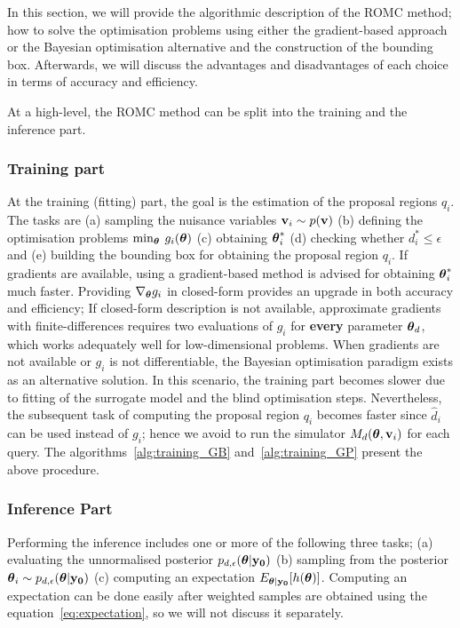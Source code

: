 In this section, we will provide the algorithmic description of the
ROMC method; how to solve the optimisation problems using either the
gradient-based approach or the Bayesian optimisation alternative and
the construction of the bounding box. Afterwards, we will discuss the
advantages and disadvantages of each choice in terms of accuracy and
efficiency.

At a high-level, the ROMC method can be split into the training and
the inference part.

\subsubsection*{Training part}
\noindent
At the training (fitting) part, the goal is the estimation of the
proposal regions $q_i$. The tasks are (a) sampling the nuisance
variables $\mathbf{v}_i \sim p(\mathbf{v})$ (b) defining the optimisation problems
$\min_{\boldsymbol{\theta}} \: g_i(\boldsymbol{\theta})$ (c) obtaining $\boldsymbol{\theta}_i^*$ (d)
checking whether $d_i^* \leq \epsilon$ and (e) building the bounding
box for obtaining the proposal region $q_i$. If gradients are
available, using a gradient-based method is advised for obtaining
$\boldsymbol{\theta}_i^*$ much faster. Providing $\nabla_{\boldsymbol{\theta}} g_i$ in
closed-form provides an upgrade in both accuracy and efficiency; If
closed-form description is not available, approximate gradients with
finite-differences requires two evaluations of $g_i$ for
\textbf{every} parameter $\boldsymbol{\theta}_d$, which works adequately well for
low-dimensional problems. When gradients are not available or $g_i$ is
not differentiable, the Bayesian optimisation paradigm exists as an
alternative solution. In this scenario, the training part becomes
slower due to fitting of the surrogate model and the blind
optimisation steps. Nevertheless, the subsequent task of computing the
proposal region $q_i$ becomes faster since $\hat{d}_i$ can be used
instead of $g_i$; hence we avoid to run the simulator
$M_d(\boldsymbol{\theta}, \mathbf{v}_i)$ for each query. The
algorithms~\ref{alg:training_GB} and~\ref{alg:training_GP} present the
above procedure.

\subsubsection*{Inference Part}
Performing the inference includes one or more of the following three
tasks; (a) evaluating the unnormalised posterior
$p_{d, \epsilon}(\boldsymbol{\theta}|\mathbf{y_0})$ (b) sampling from the posterior
$ \boldsymbol{\theta}_i \sim p_{d, \epsilon}(\boldsymbol{\theta}|\mathbf{y_0})$ (c) computing an
expectation $E_{\boldsymbol{\theta}|\mathbf{y_0}}[h(\boldsymbol{\theta})]$. Computing an expectation
can be done easily after weighted samples are obtained using the
equation~\ref{eq:expectation}, so we will not discuss it separately.

